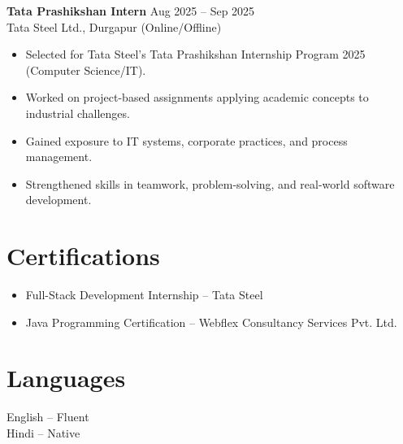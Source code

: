 \documentclass[a4paper,11pt]{article}
\begin{document}
\textbf{Tata Prashikshan Intern} \hfill Aug 2025 -- Sep 2025 \\
Tata Steel Ltd., Durgapur (Online/Offline)
\begin{itemize}[leftmargin=*]
  \item Selected for Tata Steel’s Tata Prashikshan Internship Program 2025 (Computer Science/IT).
  \item Worked on project-based assignments applying academic concepts to industrial challenges.
  \item Gained exposure to IT systems, corporate practices, and process management.
  \item Strengthened skills in teamwork, problem-solving, and real-world software development.
\end{itemize}

\section*{Certifications}
\begin{itemize}[leftmargin=*]
  \item Full-Stack Development Internship – Tata Steel
  \item Java Programming Certification – Webflex Consultancy Services Pvt. Ltd.
\end{itemize}

\section*{Languages}
English – Fluent \\
Hindi – Native
\end{document}
